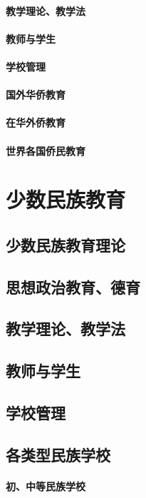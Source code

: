 \documentclass[UTF8]{../../ApplicationUniverse}
\begin{document}
    \subsubsection{教学理论、教学法}
    \subsubsection{教师与学生}
    \subsubsection{学校管理}
    \subsubsection{国外华侨教育}
    \subsubsection{在华外侨教育}
    \subsubsection{世界各国侨民教育}



\chapter{少数民族教育}
    \section{少数民族教育理论}
    \section{思想政治教育、德育}
    \section{教学理论、教学法}
    \section{教师与学生}
    \section{学校管理}
    \section{各类型民族学校}
        \subsubsection{初、中等民族学校}
\end{document}
